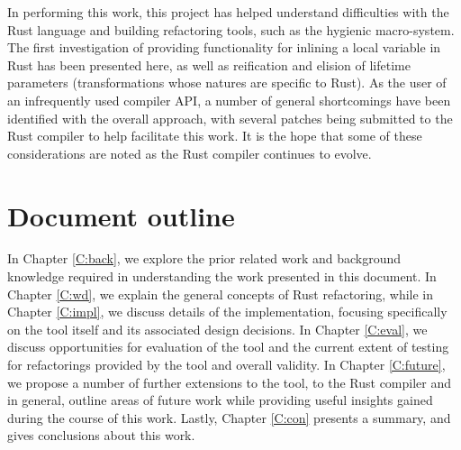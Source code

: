 In performing this work, this project has helped understand difficulties with the Rust language and building refactoring tools, such as the hygienic macro-system. The first investigation of providing functionality for inlining a local variable in Rust has been presented here, as well as reification and elision of lifetime parameters (transformations whose natures are specific to Rust). As the user of an infrequently used compiler API, a number of general shortcomings have been identified with the overall approach, with several patches being submitted to the Rust compiler to help facilitate this work. It is the hope that some of these considerations are noted as the Rust compiler continues to evolve.

\section{Document outline}\label{S:outline}
In Chapter \ref{C:back}, we explore the prior related work and background knowledge required in understanding the work presented in this document. In Chapter \ref{C:wd}, we explain the general concepts of Rust refactoring, while in Chapter \ref{C:impl}, we discuss details of the implementation, focusing specifically on the tool itself and its associated design decisions. In Chapter \ref{C:eval}, we discuss opportunities for evaluation of the tool and the current extent of testing for refactorings provided by the tool and overall validity. In Chapter \ref{C:future}, we propose a number of further extensions to the tool, to the Rust compiler and in general, outline areas of future work while providing useful insights gained during the course of this work. Lastly, Chapter \ref{C:con} presents a summary, and gives conclusions about this work.